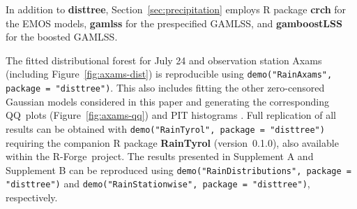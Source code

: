 \documentclass[aoas, preprint]{imsart}
\numberwithin{equation}{subsection}
\begin{document}
In addition to \textbf{disttree}, Section~\ref{sec:precipitation} employs
\textsf{R} package \textbf{crch} 
\citep[version~1.0.1]{Messner+Mayr+Zeileis:2016} for the EMOS 
models, \textbf{gamlss}
\citep[version~5.1.0]{Stasinopoulos+Rigby:2007} for the 
prespecified GAMLSS, and \textbf{gamboostLSS}
\citep[version~2.0.1]{Hofner+Mayr+Schmid:2016} for the boosted GAMLSS.

The fitted distributional forest for July 24 and
observation station Axams (including Figure~\ref{fig:axams-dist})
is reproducible using \texttt{demo("RainAxams", package = "disttree")}.
This also includes fitting the other zero-censored
Gaussian models considered in this paper and generating the corresponding 
QQ~plots (Figure~\ref{fig:axams-qq}) and PIT histograms 
\citep[Supplement B]{Schlosser+Hothorn+Stauffer:2018b}.
Full replication of all results can be obtained with
\texttt{demo("RainTyrol", package = "disttree")}
requiring the companion \textsf{R} package \textbf{RainTyrol} 
(version~0.1.0),
also available within the \textsf{R}-Forge~project.
The results presented in Supplement A \citep{Schlosser+Hothorn+Stauffer:2018a} and 
Supplement B \citep{Schlosser+Hothorn+Stauffer:2018b} can be reproduced using
\texttt{demo("RainDistributions", package = "disttree")} and 
\texttt{demo("RainStationwise", package = "disttree")}, respectively.
\end{document}

